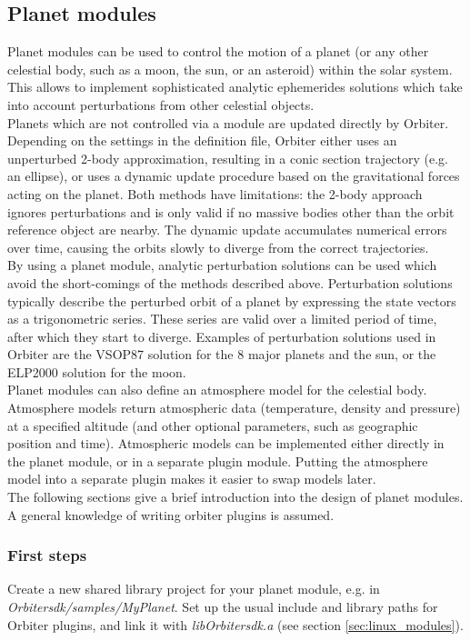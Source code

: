 \documentclass[Orbiter Developer Manual.tex]{subfiles}
\begin{document}
\subsection{Planet modules}
\label{ssec:planet_module}
Planet modules can be used to control the motion of a planet (or any other celestial body, such as a moon, the sun, or an asteroid) within the solar system. This allows to implement sophisticated analytic ephemerides solutions which take into account perturbations from other celestial objects.\\
Planets which are not controlled via a module are updated directly by Orbiter. Depending on the settings in the definition file, Orbiter either uses an unperturbed 2-body approximation, resulting in a conic section trajectory (e.g. an ellipse), or uses a dynamic update procedure based on the gravitational forces acting on the planet. Both methods have limitations: the 2-body approach ignores perturbations and is only valid if no massive bodies other than the orbit reference object are nearby. The dynamic update accumulates numerical errors over time, causing the orbits slowly to diverge from the correct trajectories.\\
By using a planet module, analytic perturbation solutions can be used which avoid the short-comings of the methods described above. Perturbation solutions typically describe the perturbed orbit of a planet by expressing the state vectors as a trigonometric series. These series are valid over a limited period of time, after which they start to diverge. Examples of perturbation solutions used in Orbiter are the VSOP87 solution for the 8 major planets and the sun, or the ELP2000 solution for the moon.\\
Planet modules can also define an atmosphere model for the celestial body. Atmosphere models return atmospheric data (temperature, density and pressure) at a specified altitude (and other optional parameters, such as geographic position and time). Atmospheric models can be implemented either directly in the planet module, or in a separate plugin module. Putting the atmosphere model into a separate plugin makes it easier to swap models later.\\
The following sections give a brief introduction into the design of planet modules. A general knowledge of writing orbiter plugins is assumed.

\subsubsection{First steps}
Create a new shared library project for your planet module, e.g. in \textit{Orbitersdk/samples/MyPlanet}. Set up the usual include and library paths for Orbiter plugins, and link it with \textit{libOrbitersdk.a} (see section \ref{sec:linux_modules}).
\end{document}
